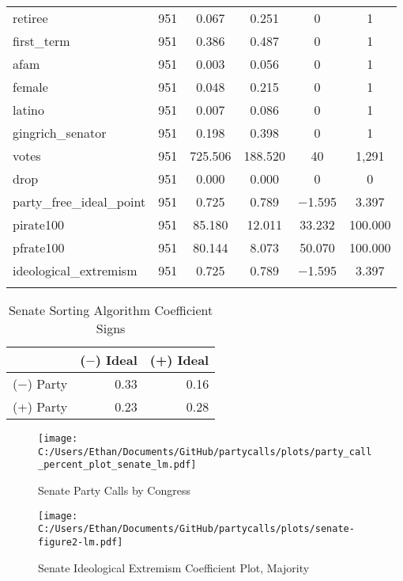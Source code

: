 \documentclass[12pt]{article}
\begin{document}
\begin{table}[H]
\begin{tabular}{@{\extracolsep{5pt}}lccccc}
		retiree & 951 & 0.067 & 0.251 & 0 & 1 \\ 
		first\_term & 951 & 0.386 & 0.487 & 0 & 1 \\ 
		afam & 951 & 0.003 & 0.056 & 0 & 1 \\ 
		female & 951 & 0.048 & 0.215 & 0 & 1 \\ 
		latino & 951 & 0.007 & 0.086 & 0 & 1 \\ 
		gingrich\_senator & 951 & 0.198 & 0.398 & 0 & 1 \\ 
		votes & 951 & 725.506 & 188.520 & 40 & 1,291 \\ 
		drop & 951 & 0.000 & 0.000 & 0 & 0 \\ 
		party\_free\_ideal\_point & 951 & 0.725 & 0.789 & $-$1.595 & 3.397 \\ 
		pirate100 & 951 & 85.180 & 12.011 & 33.232 & 100.000 \\ 
		pfrate100 & 951 & 80.144 & 8.073 & 50.070 & 100.000 \\ 
		ideological\_extremism & 951 & 0.725 & 0.789 & $-$1.595 & 3.397 \\ 
		\hline \\[-1.8ex] 
	\end{tabular} 
\end{table} 

\begin{table}[H]
	\centering
	\caption{Senate Sorting Algorithm Coefficient Signs}
	\begin{tabular}{rrr}
		\hline
		& ($-$) Ideal & (+) Ideal \\ 
		\hline
		($-$) Party & 0.33 & 0.16 \\ 
		(+) Party & 0.23 & 0.28 \\ 
		\hline
	\end{tabular}
\end{table}

\begin{figure}[H]
	\centering
	\caption{Senate Party Calls by Congress}
	\texttt{[image: C:/Users/Ethan/Documents/GitHub/partycalls/plots/party\_call\_percent\_plot\_senate\_lm.pdf]}
\end{figure}

\begin{figure}[H]
	\centering
	\caption{Senate Ideological Extremism Coefficient Plot, Majority}
	\texttt{[image: C:/Users/Ethan/Documents/GitHub/partycalls/plots/senate-figure2-lm.pdf]}
\end{figure}
\end{document}

